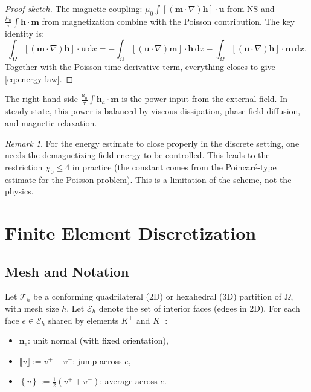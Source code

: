 \documentclass[11pt,a4paper]{article}
\theoremstyle{definition}
\theoremstyle{remark}
\newtheorem{remark}[proposition]{Remark}
\newcommand{\dd}{\,\mathrm{d}}
\newcommand{\grad}{\nabla}
\newcommand{\half}{\tfrac{1}{2}}
\newcommand{\jump}[1]{\llbracket #1 \rrbracket}
\newcommand{\avg}[1]{\left\{ #1 \right\}}
\newcommand{\bfu}{\bm{u}}
\newcommand{\bfm}{\bm{m}}
\newcommand{\bfh}{\bm{h}}
\newcommand{\bfn}{\bm{n}}
\newcommand{\Th}{\mathcal{T}_h}
\newcommand{\Eh}{\mathcal{E}_h}
\begin{document}
\begin{proof}[Proof sketch]
The magnetic coupling: $\mu_0\int[(\bfm\cdot\grad)\bfh]\cdot\bfu$ from NS
and $\frac{\mu_0}{\tau}\int\bfh\cdot\bfm$ from magnetization
combine with the Poisson contribution. The key identity is:
\[
  \int_\Omega [(\bfm\cdot\grad)\bfh]\cdot\bfu \dd x
  = -\int_\Omega [(\bfu\cdot\grad)\bfm]\cdot\bfh \dd x
    - \int_\Omega [(\bfu\cdot\grad)\bfh]\cdot\bfm \dd x.
\]
Together with the Poisson time-derivative term, everything closes to
give \eqref{eq:energy-law}.
\end{proof}

\begin{keypoint}
The right-hand side $\frac{\mu_0}{\tau}\int\bfh_a\cdot\bfm$ is the
power input from the external field. In steady state, this power is
balanced by viscous dissipation, phase-field diffusion, and magnetic
relaxation.
\end{keypoint}

\begin{remark}
  \label{rem:chi-restriction}
  For the energy estimate to close properly in the discrete setting, one
  needs the demagnetizing field energy to be controlled. This leads to
  the restriction $\chi_0 \leq 4$ in practice (the constant comes from
  the Poincar\'e-type estimate for the Poisson problem). This is a
  limitation of the scheme, not the physics.
\end{remark}


\section{Finite Element Discretization}
\label{sec:fem}

\subsection{Mesh and Notation}

Let $\Th$ be a conforming quadrilateral (2D) or hexahedral (3D)
partition of $\Omega$, with mesh size $h$. Let $\Eh$ denote the set of
interior faces (edges in 2D). For each face $e \in \Eh$ shared by
elements $K^+$ and $K^-$:
\begin{itemize}[nosep]
  \item $\bfn_e$: unit normal (with fixed orientation),
  \item $\jump{v} := v^+ - v^-$: jump across $e$,
  \item $\avg{v} := \half(v^+ + v^-)$: average across $e$.
\end{itemize}
\end{document}
